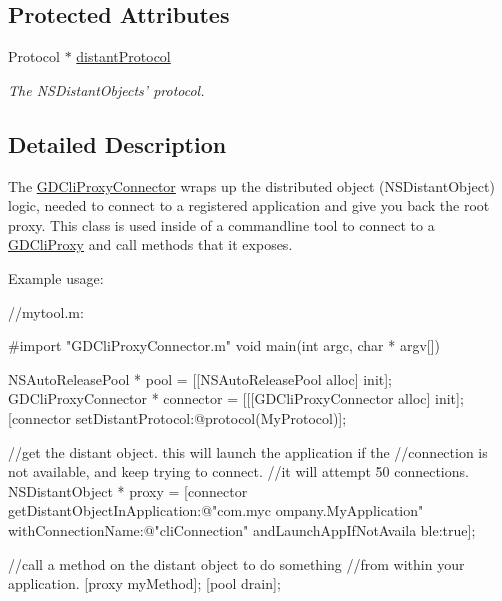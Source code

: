 \subsection*{Protected Attributes}
\begin{DoxyCompactItemize}
\item 
\hypertarget{interface_g_d_cli_proxy_connector_a59f48e81ccdc1ce15d3f0274910e13c6}{
Protocol $\ast$ \hyperlink{interface_g_d_cli_proxy_connector_a59f48e81ccdc1ce15d3f0274910e13c6}{distantProtocol}}
\label{interface_g_d_cli_proxy_connector_a59f48e81ccdc1ce15d3f0274910e13c6}

\begin{DoxyCompactList}\small\item\em The NSDistantObjects' protocol. \item\end{DoxyCompactList}\end{DoxyCompactItemize}


\subsection{Detailed Description}
The \hyperlink{interface_g_d_cli_proxy_connector}{GDCliProxyConnector} wraps up the distributed object (NSDistantObject) logic, needed to connect to a registered application and give you back the root proxy. This class is used inside of a commandline tool to connect to a \hyperlink{interface_g_d_cli_proxy}{GDCliProxy} and call methods that it exposes.

Example usage: 
\begin{DoxyCode}
 //mytool.m:
 
 #import "GDCliProxyConnector.m"
 void main(int argc, char * argv[]) {
     NSAutoReleasePool * pool = [[NSAutoReleasePool alloc] init];
     GDCliProxyConnector * connector = [[[GDCliProxyConnector alloc] init];
     [connector setDistantProtocol:@protocol(MyProtocol)];
     
     //get the distant object. this will launch the application if the
     //connection is not available, and keep trying to connect.
     //it will attempt 50 connections.
     NSDistantObject * proxy = [connector getDistantObjectInApplication:@"com.myc
      ompany.MyApplication" withConnectionName:@"cliConnection" andLaunchAppIfNotAvaila
      ble:true];
     
     //call a method on the distant object to do something
     //from within your application.
     [proxy myMethod];
     [pool drain];
 }
\end{DoxyCode}
 

